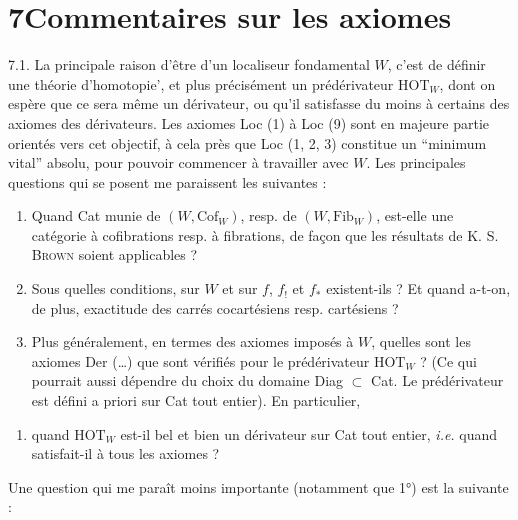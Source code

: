 \documentclass[11pt]{article}
\newcommand{\printedpage}[1]{\marginpar{\footnotesize p.~#1}}
\newcommand{\msp}[1]{\marginpar{\footnotesize [#1]}}
\begin{document}
\msp{page 97}

\section*{7\quad Commentaires sur les axiomes}

7.1. La principale raison d'être d'un localiseur fondamental $W$, c'est de définir une théorie d'homotopie’, et plus précisément un prédérivateur $\mathrm{HOT}_W$, dont on espère que ce sera même un dérivateur, ou qu'il satisfasse du moins à certains des axiomes des dérivateurs. Les axiomes Loc (1) à Loc (9) sont en majeure partie orientés vers cet objectif, à cela près que Loc (1, 2, 3) constitue un “minimum vital” absolu, pour pouvoir commencer à travailler avec $W$. Les principales questions qui se posent me paraissent les suivantes : %
\begin{enumerate}[label={}, leftmargin=2.5em]
\item[1)] Quand Cat munie de $(W, \mathrm{Cof}_W)$, resp. de $(W, \mathrm{Fib}_W)$, est-elle une catégorie à cofibrations resp. à fibrations, de façon que les résultats de K. S. \textsc{Brown} soient applicables ?
\item[2)] Sous quelles conditions, sur $W$ et sur $f$, $f_!$ et $f_*$ existent-ils ? Et quand a-t-on, de plus, exactitude des carrés cocartésiens resp. cartésiens ?

\msp{page 98}
\item[3)] Plus généralement, en termes des axiomes imposés à $W$, quelles sont les axiomes Der (\ldots) que sont vérifiés pour le prédérivateur $\mathrm{HOT}_W$ ? (Ce qui pourrait aussi dépendre du choix du domaine Diag $\subset$ Cat. Le prédérivateur est défini a priori sur Cat tout entier). En particulier, %
\end{enumerate}

\printedpage{49}

\begin{enumerate}[label=4)]
\item quand $\mathrm{HOT}_W$ est-il bel et bien un dérivateur sur Cat tout entier, \textit{i.e.} quand satisfait-il à tous les axiomes ?
\end{enumerate}

Une question qui me paraît moins importante (notamment que 1°) est la suivante :
\end{document}
